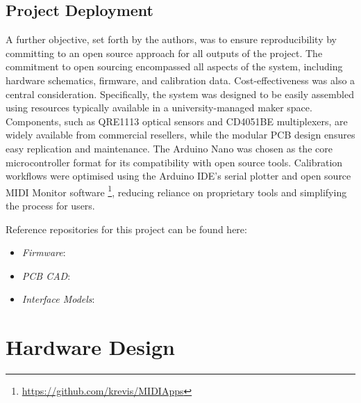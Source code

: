 \subsection{Project Deployment}

A further objective, set forth by the authors, was to ensure reproducibility by committing to an open source approach for all outputs of the project. The commitment to open sourcing encompassed all aspects of the system, including hardware schematics, firmware, and calibration data. Cost-effectiveness was also a central consideration. 
Specifically, the system was designed to be easily assembled using resources typically available in a university-managed maker space. Components, such as QRE1113 optical sensors and CD4051BE multiplexers, are widely available from commercial resellers, while the modular PCB design ensures easy replication and maintenance. The Arduino Nano was chosen as the core microcontroller format for its compatibility with open source tools. Calibration workflows were optimised using the Arduino IDE’s serial plotter and open source MIDI Monitor software \footnote{\url{https://github.com/krevis/MIDIApps}}, reducing reliance on proprietary tools and simplifying the process for users. 

\begin{anonsuppress}
Reference repositories for this project can be found here:

    \begin{itemize}
        \item 
        \emph{Firmware}: 
        \item 
        \emph{PCB CAD}: 
        \item 
        \emph{Interface Models}: 
    \end{itemize}
\end{anonsuppress}


\section{Hardware Design}\label{hardware-design}


